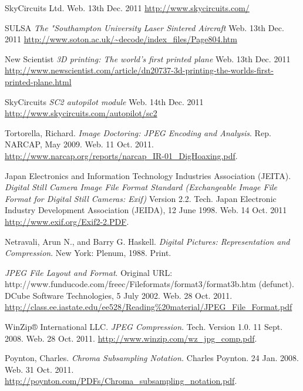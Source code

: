 

\begin{thebibliography}{9}

	 SkyCircuits Ltd. Web. 13th Dec. 2011 \url{http://www.skycircuits.com/}

	 SULSA \emph{The "Southampton University Laser Sintered Aircraft} Web. 13th Dec. 2011 \url{http://www.soton.ac.uk/~decode/index_files/Page804.htm}

	 New Scientist \emph{3D printing: The world's first printed plane} Web. 13th Dec. 2011 \url{http://www.newscientist.com/article/dn20737-3d-printing-the-worlds-first-printed-plane.html}

	 SkyCircuits \emph{SC2 autopilot module} Web. 14th Dec. 2011 \url{http://www.skycircuits.com/autopilot/sc2}

	 Tortorella, Richard. \emph{Image Doctoring: JPEG Encoding and Analysis}. Rep. NARCAP, May 2009. Web. 11 Oct. 2011. \url{http://www.narcap.org/reports/narcap_IR-01_DigHoaxing.pdf}.
	
	 Japan Electronics and Information Technology Industries Association (JEITA). \emph{Digital Still Camera Image File Format Standard (Exchangeable Image File Format for Digital Still Cameras: Exif)} Version 2.2. Tech. Japan Electronic Industry Development Association (JEIDA), 12 June 1998. Web. 14 Oct. 2011 \url{http://www.exif.org/Exif2-2.PDF}.
	
	 Netravali, Arun N., and Barry G. Haskell. \emph{Digital Pictures: Representation and Compression}. New York: Plenum, 1988. Print. 
	
	 \emph{JPEG File Layout and Format}. Original URL: \\http://www.funducode.com/freec/Fileformats/format3/format3b.htm (defunct).\\DCube Software Technologies, 5 July 2002. Web. 28 Oct. 2011. \url{http://class.ee.iastate.edu/ee528/Reading%20material/JPEG_File_Format.pdf}
	
	 WinZip® International LLC. \emph{JPEG Compression}. Tech. Version 1.0. 11 Sept. 2008. Web. 28 Oct. 2011. \url{http://www.winzip.com/wz_jpg_comp.pdf}.
	
	 Poynton, Charles. \emph{Chroma Subsampling Notation.} Charles Poynton. 24 Jan. 2008. Web. 31 Oct. 2011. \url{http://poynton.com/PDFs/Chroma_subsampling_notation.pdf}.
	

\end{thebibliography}
